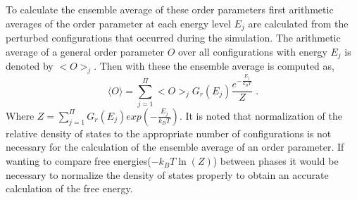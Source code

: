 \documentclass[aps,pre,reprint,superscriptaddress,showkeys]{revtex4-2}
\begin{document}
To calculate the ensemble average of these order parameters first arithmetic averages of the order parameter at each energy level $E_j$ are calculated from the perturbed configurations  that occurred during the simulation. The arithmetic average of a general order parameter $O$ over all configurations with energy $E_j$ is denoted by $< O >_j$. Then with these the ensemble average is computed as, 
  \begin{equation}
  \langle O \rangle  =  \sum_{j=1}^{\Pi}< O >_j G_r(E_j) \frac{e^{-\frac{E_j}{k_BT}}}{Z} \;.
  \label{ensembleaverage}
  \end{equation}
  Where $Z= \sum_{j=1}^{\Pi} G_r(E_j) exp(-\frac{E_j}{k_BT})$. 
It is noted that normalization of the relative density of states to the appropriate number of configurations is not necessary for the calculation of the ensemble average of an order parameter. If wanting to compare free energies($-k_BT\ln(Z)$) between phases it would be necessary to normalize the density of states properly to obtain an accurate calculation of the free energy. 
\end{document}
